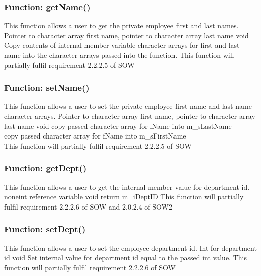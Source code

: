 \documentclass[12pt]{article}%
\newcounter{subsubsubsection}[subsubsection]
\begin{document}
\subsubsection{Function:  getName()}
This function allows a user to get the private employee first and last names.
Pointer to character array first name, pointer to character array last name
void
Copy contents of internal member variable character arrays for first and last name into the
character arrays passed into the function.
This function will partially fulfil requirement 2.2.2.5 of SOW


\subsubsection{Function:  setName()}
This function allows a user to set the private employee first name and last name character arrays.
Pointer to character array first name, pointer to character array last name
void
copy passed character array for lName into m\_sLastName\\
copy passed character array for fName into m\_sFirstName\\
This function will partially fulfil requirement 2.2.2.5 of SOW

\subsubsection{Function:  getDept()}
This function allows a user to get the internal member value for department id.
noneint reference variable
void
return m\_iDeptID
This function will partially fulfil requirement 2.2.2.6 of SOW and 2.0.2.4 of SOW2

\subsubsection{Function:  setDept()}
This function allows a user to set the employee department id.
Int for department id
void
Set internal value for department id equal to the passed int value.
This function will partially fulfil requirement 2.2.2.6 of SOW
\end{document}
